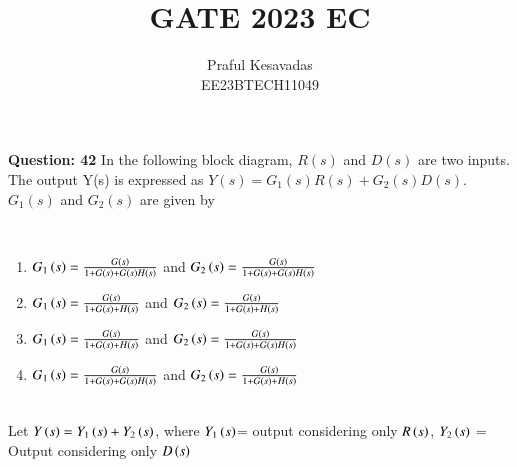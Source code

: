 \documentclass[journal,12pt,onecolumn]{IEEEtran}
\theoremstyle{remark}
\begin{document}
\let\vec\mathbf







\bigskip

\renewcommand{\thefigure}{\theenumi}
\renewcommand{\thetable}{\theenumi}


\title{GATE 2023 EC}
\author{Praful Kesavadas\\ EE23BTECH11049}
\maketitle

\textbf{Question: 42} In the following block diagram, $R(s)$ and $D(s)$ are two inputs. The output Y(s) is expressed as $Y(s) = G_1(s)R(s) + G_2(s)D(s).$\\
$G_1(s)$ and $G_2(s)$ are given by\\
\begin{figure}[htbp!]
\centering

\end{figure}\\
\begin{enumerate}[label=\alph*)]
\item $G_1\left(s\right) = \frac{G\left(s\right)}{1+G\left(s\right)+G\left(s\right)H\left(s\right)}$ and $G_2\left(s\right) = \frac{G\left(s\right)}{1+ G\left(s\right)+G\left(s\right)H\left(s\right)}$\\
\item $G_1\left(s\right) = \frac{G\left(s\right)}{1+G\left(s\right)+H\left(s\right)}$ and $G_2\left(s\right) = \frac{G\left(s\right)}{1+ G\left(s\right)+H\left(s\right)}$\\
\item $G_1\left(s\right) = \frac{G\left(s\right)}{1+G\left(s\right)+H\left(s\right)}$ and $G_2\left(s\right) = \frac{G\left(s\right)}{1+ G\left(s\right)+G\left(s\right)H\left(s\right)}$\\
\item $G_1\left(s\right) = \frac{G\left(s\right)}{1+G\left(s\right)+G\left(s\right)H\left(s\right)}$ and $G_2\left(s\right) = \frac{G\left(s\right)}{1+ G\left(s\right)+H\left(s\right)}$\\
\end{enumerate}
\solution\\
Let $Y\left(s\right)= Y_1\left(s\right) + Y_2\left(s\right)$, where $Y_1\left(s\right)$= output considering only $R\left(s\right)$, $Y_2\left(s\right)$ = Output considering only $D\left(s\right)$\\
\end{document}
